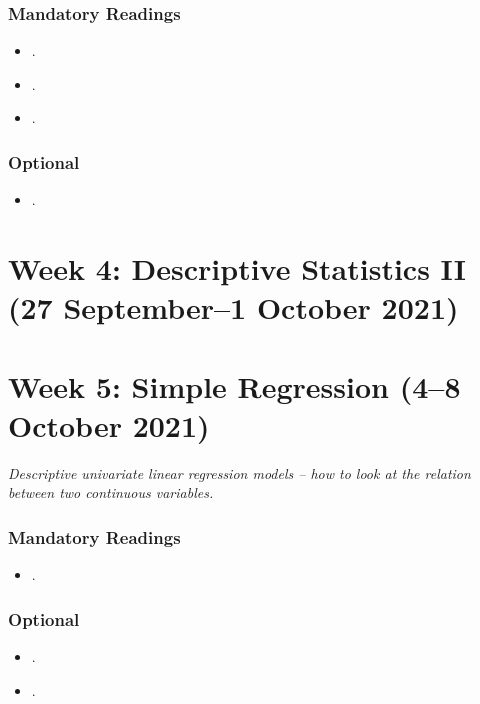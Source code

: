 \documentclass[abstract=on,parskip=full,headings=standardclasses,fontsize=11pt,paper=a4]{scrartcl}
\begin{document}
\subsubsection*{Mandatory Readings}
\begin{itemize}
\item {}.
\item {}.
\item {}.
\end{itemize}

\subsubsection*{Optional}
\begin{itemize}
\item {}.
\end{itemize}



\section{Week 4: Descriptive Statistics II (27 September--1 October 2021)}



\section{Week 5: Simple Regression (4--8 October 2021)}

\textit{Descriptive univariate linear regression models -- how to look at the relation between two continuous variables.}


\subsubsection*{Mandatory Readings}

\begin{itemize}
\item {}.
\end{itemize}


\subsubsection*{Optional}
\begin{itemize}
\item {}.
\item {}.
\end{itemize}
\end{document}
